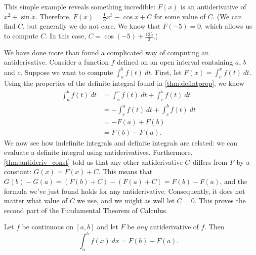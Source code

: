 This simple example reveals something incredible: $F(x)$ is an antiderivative of $x^2+\sin x$. Therefore, $F(x) = \frac13x^3-\cos x+C$ for some value of $C$. (We can find $C$, but generally we do not care. We know that $F(-5)=0$, which allows us to compute $C$. In this case, $C=\cos(-5)+\frac{125}3$.)

We have done more than found a complicated way of computing an antiderivative. Consider a function $f$ defined on an open interval containing $a$, $b$ and $c$. Suppose we want to compute $\int_a^b f(t)\ dt$. First, let $F(x) = \int_c^x f(t)\ dt$. Using the properties of the definite integral found in \autoref{thm:defintprop}, we know 
\begin{align*}
	\int_a^b f(t)\ dt
	&= \int_a^c f(t)\ dt + \int_c^b f(t)\ dt \\
	&= -\int_c^a f(t)\ dt + \int_c^b f(t)\ dt \\
	&=-F(a) + F(b)\\
	&= F(b) - F(a).
\end{align*}
We now see how indefinite integrals and definite integrals are related: we can evaluate a definite integral using antiderivatives.  Furthermore, \autoref{thm:antideriv_const} told us that any other antiderivative $G$ differs from $F$ by a constant: $G(x)=F(x)+C$.  This means that $G(b)-G(a)=(F(b)+C)-(F(a)+C)=F(b)-F(a)$, and the formula we've just found holds for any antiderivative.  Consequently, it does not matter what value of $C$ we use, and we might as well let $C=0$. This proves the second part of the Fundamental Theorem of Calculus.

\begin{theorem}\label{thm:FTC2}
Let $f$ be continuous on $[a,b]$ and let $F$ be \textit{any} antiderivative of $f$. Then \[\int_a^b f(x)\ dx = F(b) - F(a).\]
\end{theorem}



